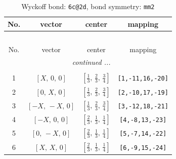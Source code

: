 \documentclass[fleqn,8pt]{jsarticle}
\begin{document}
\begin{longtable}{cccc}
\caption{Wyckoff bond: {\tt 6c@2d}, bond symmetry: {\tt mm2}}
 \\
 \hline \hline
No. & vector & center & mapping \\ \hline \endfirsthead

\multicolumn{3}{l}{\tablename\ \thetable{}} \\
 \hline \hline
No. & vector & center & mapping \\ \hline \endhead

 \hline \hline
\multicolumn{3}{r}{\footnotesize\it continued ...} \\ \endfoot

 \hline \hline
\multicolumn{3}{r}{} \\ \endlastfoot

1 & $\left[ X,\, 0,\, 0 \right]$ & $\left[ \frac{1}{3},\, \frac{2}{3},\, \frac{3}{4} \right]$ & {\tt [1,-11,16,-20]} \\ \hline
2 & $\left[ 0,\, X,\, 0 \right]$ & $\left[ \frac{1}{3},\, \frac{2}{3},\, \frac{3}{4} \right]$ & {\tt [2,-10,17,-19]} \\ \hline
3 & $\left[ - X,\, - X,\, 0 \right]$ & $\left[ \frac{1}{3},\, \frac{2}{3},\, \frac{3}{4} \right]$ & {\tt [3,-12,18,-21]} \\ \hline
4 & $\left[ - X,\, 0,\, 0 \right]$ & $\left[ \frac{2}{3},\, \frac{1}{3},\, \frac{1}{4} \right]$ & {\tt [4,-8,13,-23]} \\ \hline
5 & $\left[ 0,\, - X,\, 0 \right]$ & $\left[ \frac{2}{3},\, \frac{1}{3},\, \frac{1}{4} \right]$ & {\tt [5,-7,14,-22]} \\ \hline
6 & $\left[ X,\, X,\, 0 \right]$ & $\left[ \frac{2}{3},\, \frac{1}{3},\, \frac{1}{4} \right]$ & {\tt [6,-9,15,-24]} \\
\end{longtable}
\renewcommand{\arraystretch}{1.2}
\end{document}
